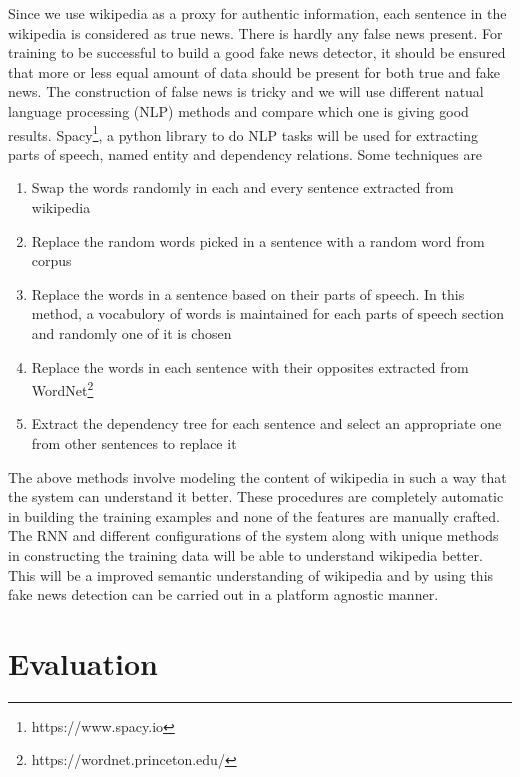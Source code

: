 \documentclass[a4paper, 11pt]{article}
\begin{document}
Since we use wikipedia as a proxy for authentic information, each sentence in the wikipedia is considered as true news. There is hardly any false news present. For training to be successful to build a good fake news detector, it should be ensured that more or less equal amount of data should be present for both true and fake news. The construction of false news is tricky and we will use different natual language processing (NLP) methods and compare which one is giving good results. Spacy\footnote{https://www.spacy.io}, a python library to do NLP tasks will be used for extracting parts of speech, named entity and dependency relations. Some techniques are 
\begin{enumerate}
\item Swap the words randomly in each and every sentence extracted from wikipedia
\item Replace the random words picked in a sentence with a random word from corpus
\item Replace the words in a sentence based on their parts of speech. In this method, a vocabulory of words is maintained for each parts of speech section and randomly one of it is chosen
\item Replace the words in each sentence with their opposites extracted from WordNet\footnote{https://wordnet.princeton.edu/}
\item Extract the dependency tree for each sentence and select an appropriate one from other sentences to replace it
\end{enumerate}


The above methods involve modeling the content of wikipedia in such a way that the system can understand it better. These procedures are completely automatic in building the training examples and none of the features are manually crafted. The RNN and different configurations of the system along with unique methods in constructing the training data will be able to understand wikipedia better. This will be a improved semantic understanding of wikipedia and by using this fake news detection can be carried out in a platform agnostic manner. 

\section{Evaluation}
\end{document}
